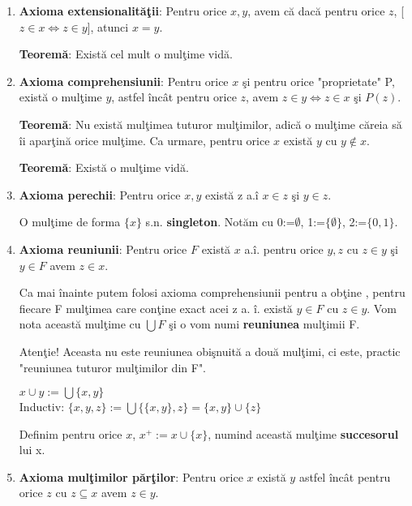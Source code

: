 \documentclass{article}
\begin{document}
\begin{enumerate}
    \item \textbf{Axioma extensionalit\u{a}\c{t}ii}: Pentru orice $x,y$, avem c\u{a} dac\u{a} pentru orice $z$, [$z \in x \iff z\in y$], atunci $x=y$.

\textbf{Teorem\u{a}}: Exist\u{a} cel mult o mul\c{t}ime vid\u{a}.

    \item \textbf{Axioma comprehensiunii}: Pentru orice $x$ \c{s}i pentru orice "proprietate" P, exist\u{a} o mul\c{t}ime $y$, astfel \^{i}nc\^{a}t pentru orice $z$, avem $z\in y \iff z\in x$ \c{s}i $P(z)$.

\textbf{Teorem\u{a}}: Nu exist\u{a} mul\c{t}imea tuturor mul\c{t}imilor, adic\u{a} o mul\c{t}ime c\u{a}reia s\u{a} \^{i}i apar\c{t}in\u{a} orice mul\c{t}ime. Ca urmare, pentru orice $x$ exist\u{a} $y$ cu $y\notin x$.


\textbf{Teorem\u{a}}: Exist\u{a} o mul\c{t}ime vid\u{a}.

    \item \textbf{Axioma perechii}: Pentru orice $x,y$ exist\u{a} z a.\^{i} $x\in z$ \c{s}i $y\in z$.

O mul\c{t}ime de forma $\{x\}$ s.n. \textbf{singleton}. Not\u{a}m cu 0:=$\emptyset$, 1:=$\{\emptyset\}$, 2:=$\{0,1\}$.

    \item \textbf{Axioma reuniunii}: Pentru orice $F$ exist\u{a} $x$ a.\^{i}. pentru orice $y,z$ cu $z\in y$ \c{s}i $y\in F$ avem $z\in x$.
    
Ca mai \^ inainte putem folosi axioma comprehensiunii pentru a ob\c tine , pentru fiecare F mul\c timea  care con\c tine exact acei z a. \^ i. exist\u a $y \in F$ cu $z\in y$. Vom nota aceast\u a mul\c time cu $\bigcup F$ \c si o vom numi \textbf{reuniunea} mul\c timii F.

Aten\c tie! Aceasta nu este reuniunea obi\c snuit\u a a dou\u a mul\c timi, ci este, practic "reuniunea tuturor mul\c timilor din F".

$x\cup y :=\bigcup \{x,y\}$\\
Inductiv: $\{x,y,z\}:=\bigcup \{\{x,y\},z\}=\{x,y\}\cup \{z\}$

Definim pentru orice $x$, $x^+:=x\cup \{x\}$, numind aceast\u a mul\c time \textbf{succesorul} lui x.

    \item \textbf{Axioma mul\c timilor p\u ar\c tilor}: Pentru orice $x$ exist\u a $y$ astfel \^ inc\^ at pentru orice $z$ cu $z\subseteq x$ avem $z \in y$.


\end{enumerate}
\end{document}
